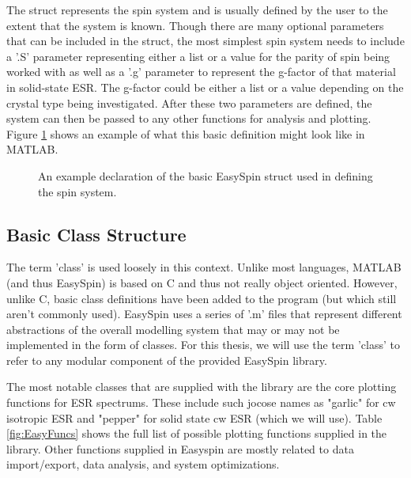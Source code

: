 \documentclass[oneside, astronomy, noacknowlegments]{BYUPhys}
\begin{document}
The struct represents the spin system and is usually defined by the user to the extent that the system is known. Though there are many optional parameters that can be included in the struct, the most simplest spin system needs to include a '.S' parameter representing either a list or a value for the parity of spin being worked with as well as a '.g' parameter to represent the g-factor of that material in solid-state ESR. The g-factor could be either a list or a value depending on the crystal type being investigated. After these two parameters are defined, the system can then be passed to any other functions for analysis and plotting. Figure \ref{fig:SpinDefinition} shows an example of what this basic definition might look like in MATLAB.

\begin{figure}
    \caption[Simple Spin System Definition]{\label{fig:SpinDefinition}
     An example declaration of the basic EasySpin struct used in defining the spin system.}
 \end{figure}

\subsection{Basic Class Structure}

The term 'class' is used loosely in this context. Unlike most languages, MATLAB (and thus EasySpin) is based on C and thus not really object oriented. However, unlike C, basic class definitions have been added to the program (but which still aren't commonly used). EasySpin uses a series of '.m' files that represent different abstractions of the overall modelling system that may or may not be implemented in the form of classes. For this thesis, we will use the term 'class' to refer to any modular component of the provided EasySpin library.

The most notable classes that are supplied with the library are the core plotting functions for ESR spectrums. These include such jocose names as "garlic" for cw isotropic ESR and "pepper" for solid state cw ESR (which we will use). Table \ref{fig:EasyFuncs} shows the full list of possible plotting functions supplied in the library. Other functions supplied in Easyspin are mostly related to data import/export, data analysis, and system optimizations.
\end{document}
